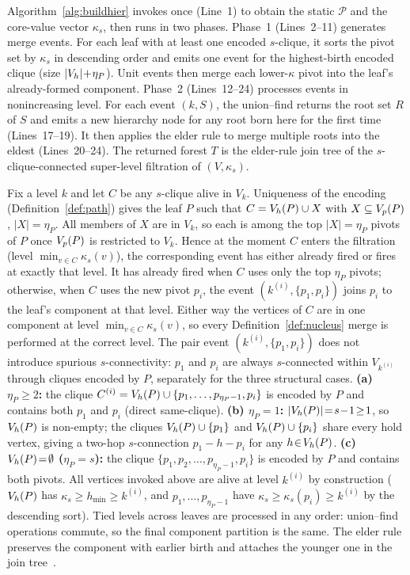 Algorithm~\ref{alg:buildhier} invokes \spinStar{} once (Line~1) to obtain the static \cpi{} $\mathcal{P}$ and the core-value vector $\kappa_s$, then runs in two phases.
%
Phase~1 (Lines~2--11) generates merge events.
%
For each leaf with at least one encoded $s$-clique, it sorts the pivot set by $\kappa_s$ in descending order and emits one event for the highest-birth encoded clique (size $|V_h|\!+\!\eta_P$).
%
Unit events then merge each lower-$\kappa$ pivot into the leaf's already-formed component.
%
Phase~2 (Lines~12--24) processes events in nonincreasing level.
%
For each event $(k,S)$, the union--find returns the root set $R$ of $S$ and emits a new hierarchy node for any root born here for the first time (Lines~17--19).
%
It then applies the elder rule to merge multiple roots into the eldest (Lines~20--24).
%
The returned forest $T$ is the elder-rule join tree of the $s$-clique-connected super-level filtration of $(V,\kappa_s)$.

Fix a level $k$ and let $C$ be any $s$-clique alive in $V_k$.
%
Uniqueness of the \cpi{} encoding (Definition~\ref{def:path}) gives the leaf $P$ such that $C=V_h(P)\cup X$ with $X\subseteq V_p(P)$, $|X|=\eta_P$.
%
All members of $X$ are in $V_k$, so each is among the top $|X|\!=\!\eta_P$ pivots of $P$ once $V_p(P)$ is restricted to $V_k$.
%
Hence at the moment $C$ enters the filtration (level $\min_{v\in C}\kappa_s(v)$), the corresponding event has either already fired or fires at exactly that level.
%
It has already fired when $C$ uses only the top $\eta_P$ pivots; otherwise, when $C$ uses the new pivot $p_i$, the event $(k^{(i)},\{p_1,p_i\})$ joins $p_i$ to the leaf's component at that level.
%
Either way the vertices of $C$ are in one component at level $\min_{v\in C}\kappa_s(v)$, so every Definition~\ref{def:nucleus} merge is performed at the correct level.
%
The pair event $(k^{(i)},\{p_1,p_i\})$ does not introduce spurious $s$-connectivity: $p_1$ and $p_i$ are always $s$-connected within $V_{k^{(i)}}$ through cliques encoded by $P$, separately for the three structural cases.
%
\textbf{(a) $\eta_P\!\ge\!2$:} the clique $C^{(i)}=V_h(P)\cup\{p_1,\ldots,p_{\eta_P-1},p_i\}$ is encoded by $P$ and contains both $p_1$ and $p_i$ (direct same-clique).
%
\textbf{(b) $\eta_P\!=\!1$:} $|V_h(P)|\!=\!s\!-\!1\!\ge\!1$, so $V_h(P)$ is non-empty; the cliques $V_h(P)\cup\{p_1\}$ and $V_h(P)\cup\{p_i\}$ share every hold vertex, giving a two-hop $s$-connection $p_1\!-\!h\!-\!p_i$ for any $h\!\in\!V_h(P)$.
%
\textbf{(c) $V_h(P)\!=\!\emptyset$ ($\eta_P\!=\!s$):} the clique $\{p_1,p_2,\ldots,p_{\eta_P-1},p_i\}$ is encoded by $P$ and contains both pivots.
%
All vertices invoked above are alive at level $k^{(i)}$ by construction ($V_h(P)$ has $\kappa_s\!\ge\!h_{\min}\!\ge\!k^{(i)}$, and $p_1,\ldots,p_{\eta_P-1}$ have $\kappa_s\!\ge\!\kappa_s(p_i)\!\ge\!k^{(i)}$ by the descending sort).
%
Tied levels across leaves are processed in any order: union--find operations commute, so the final component partition is the same.
%
The elder rule preserves the component with earlier birth and attaches the younger one in the join tree~\cite{edelsbrunner2010topology}.

